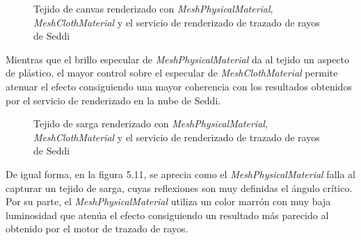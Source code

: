 \begin{figure}[H]
  \vspace{0.5cm}
  \centering
    \caption{Tejido de canvas renderizado con \textit{MeshPhysicalMaterial}, \textit{MeshClothMaterial} y el servicio de renderizado de trazado de rayos de Seddi}
\end{figure}

Mientras que el brillo especular de \textit{MeshPhysicalMaterial} da al tejido un aspecto de pl\'astico, el mayor control sobre
el especular de \textit{MeshClothMaterial} permite atenuar el efecto consiguiendo una mayor coherencia con los resultados obtenidos
por el servicio de renderizado en la nube de Seddi.

\begin{figure}[H]
  \vspace{0.5cm}
  \centering
    \caption{Tejido de sarga renderizado con \textit{MeshPhysicalMaterial}, \textit{MeshClothMaterial} y el servicio de renderizado de trazado de rayos de Seddi}
\end{figure}

De igual forma, en la figura 5.11, se aprecia como el \textit{MeshPhysicalMaterial} falla al capturar un tejido de sarga, cuyas reflexiones
son muy definidas el \'angulo cr\'itico. Por su parte, el \textit{MeshPhysicalMaterial} utiliza un color marr\'on con
muy baja luminosidad que aten\'ua el efecto consiguiendo un resultado m\'as parecido al obtenido por el motor de trazado de rayos.
